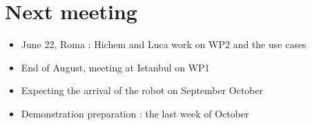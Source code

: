 \documentclass{article}
\begin{document}
\section{Next meeting}
\begin{itemize}
\item June 22, Roma : Hichem and Luca work on WP2 and the use cases
\item End of August, meeting at Istanbul on WP1
\item Expecting the arrival of the robot on September October
\item Demonstration preparation : the last week of October
\end{itemize}
\end{document}
